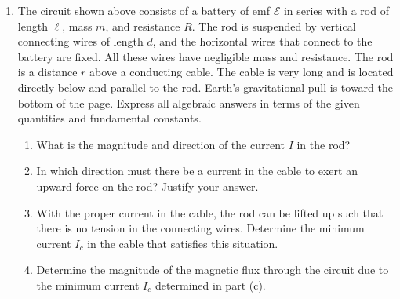 \documentclass{../../../oss-classkick}
\begin{document}
\begin{center}
\end{center}
\begin{enumerate}
\item The circuit shown above consists of a battery of emf $\mathcal{E}$ in
  series with a rod of length $\ell$, mass $m$, and resistance $R$. The rod is
  suspended by vertical connecting wires of length $d$, and the horizontal
  wires that connect to the battery are fixed. All these wires have negligible
  mass and resistance. The rod is a distance $r$ above a conducting cable. The
  cable is very long and is located directly below and parallel to the rod.
  Earth's gravitational pull is toward the bottom of the page. Express all
  algebraic answers in terms of the given quantities and fundamental constants.
  \begin{enumerate}
  \item What is the magnitude and direction of the current $I$ in the rod?
  \item In which direction must there be a current in the cable to exert an
    upward force on the rod? Justify your answer.
  \item With the proper current in the cable, the rod can be lifted up such
    that there is no tension in the connecting wires. Determine the minimum
    current $I_c$ in the cable that satisfies this situation.
  \item Determine the magnitude of the magnetic flux through the circuit due to
    the minimum current $I_c$ determined in part (c).
  \end{enumerate}
  \newpage
  

\end{enumerate}
\end{document}
